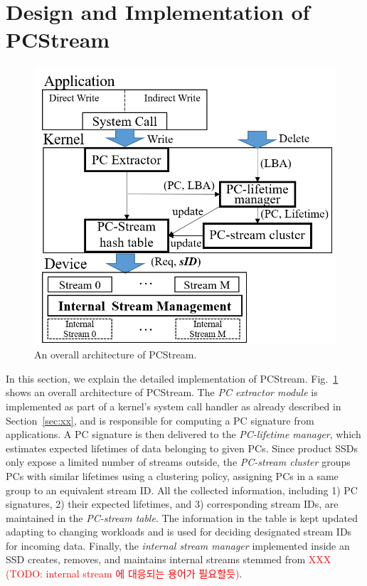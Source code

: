 \section{Design and Implementation of \textsf{PCStream}}

\begin{figure}[t]
	\centering
	\includegraphics[width=0.8\linewidth]{figure/overview.png}
	\caption{
		An overall architecture of \textsf{\small PCStream}. 
	}
	\label{fig:architecture}
\end{figure}


In this section, we explain the detailed implementation of \textsf{\small
PCStream}.  Fig.~\ref{fig:architecture} shows an overall architecture of
\textsf{\small PCStream}. The \textit{PC extractor module} is implemented as
part of a kernel's system call handler as already described in
Section~\ref{sec:xx}, and is responsible for computing a PC signature
from applications.  A PC signature is then delivered to the \textit{PC-lifetime
manager}, which estimates expected lifetimes of data belonging to given PCs.
Since product SSDs only expose a limited number of streams outside, the
\textit{PC-stream cluster} groups PCs with similar lifetimes using a clustering
policy, assigning PCs in a same group to an equivalent stream ID.  All the
collected information, including 1) PC signatures, 2) their expected lifetimes, and 3)
corresponding stream IDs, are maintained in the \textit{PC-stream table}.  The
information in the table is kept updated adapting to changing workloads and is
used for deciding designated stream IDs for incoming data. Finally, the
\textit{internal stream manager} implemented inside an SSD creates, removes,
and maintains internal streams stemmed from \textcolor{red}{XXX (TODO: internal stream
에 대응되는 용어가 필요할듯)}.


